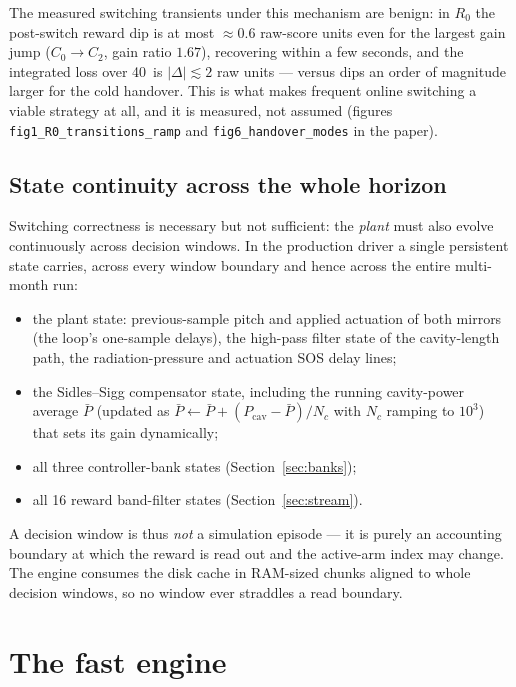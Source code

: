 \documentclass[11pt,a4paper]{article}
\newcommand{\SI}[2]{#1\,\text{#2}}
\newcommand{\code}[1]{\texttt{#1}}
\begin{document}
The measured switching transients under this mechanism are benign: in $R_0$ the
post-switch reward dip is at most $\approx 0.6$ raw-score units even for the largest
gain jump ($C_0 \!\to\! C_2$, gain ratio $1.67$), recovering within a few seconds, and
the integrated loss over \SI{40}{s} is $\lvert \Delta \rvert \lesssim 2$ raw units ---
versus dips an order of magnitude larger for the cold handover. This is what makes
frequent online switching a viable strategy at all, and it is measured, not assumed
(figures \code{fig1\_R0\_transitions\_ramp} and \code{fig6\_handover\_modes} in the
paper).

\subsection{State continuity across the whole horizon}
\label{sec:continuity}

Switching correctness is necessary but not sufficient: the \emph{plant} must also evolve
continuously across decision windows. In the production driver a single persistent state
carries, across every window boundary and hence across the entire multi-month run:
\begin{itemize}
  \item the plant state: previous-sample pitch and applied actuation of both mirrors
        (the loop's one-sample delays), the high-pass filter state of the cavity-length
        path, the radiation-pressure and actuation SOS delay lines;
  \item the Sidles--Sigg compensator state, including the running cavity-power average
        $\bar P$ (updated as $\bar P \leftarrow \bar P + (P_{\mathrm{cav}}-\bar P)/N_c$
        with $N_c$ ramping to $10^{3}$) that sets its gain dynamically;
  \item all three controller-bank states (Section~\ref{sec:banks});
  \item all 16 reward band-filter states (Section~\ref{sec:stream}).
\end{itemize}
A decision window is thus \emph{not} a simulation episode --- it is purely an
accounting boundary at which the reward is read out and the active-arm index may change.
The engine consumes the disk cache in RAM-sized chunks aligned to whole decision windows,
so no window ever straddles a read boundary.

\section{The fast engine}
\label{sec:fast}
\end{document}
